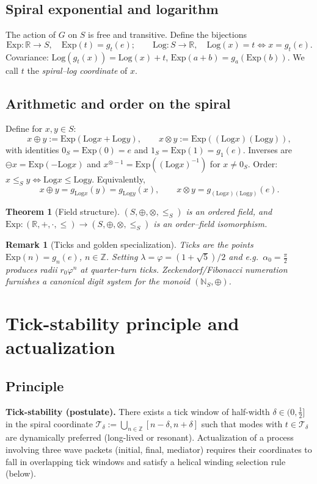 \documentclass[11pt]{article}
\newtheorem{theorem}{Theorem}
\newtheorem{remark}{Remark}
\newcommand{\Z}{\mathbb{Z}}
\newcommand{\R}{\mathbb{R}}
\newcommand{\N}{\mathbb{N}}
\newcommand{\Exp}{\mathrm{Exp}}
\newcommand{\Log}{\mathrm{Log}}
\begin{document}
\subsection{Spiral exponential and logarithm}
The action of \(G\) on \(S\) is free and transitive. Define the bijections
\begin{equation}
\Exp:\R\to S,\quad \Exp(t)=g_t(e);\qquad \Log:S\to\R,\quad \Log(x)=t\iff x=g_t(e).
\end{equation}
Covariance: \(\Log(g_t(x))=\Log(x)+t\), \(\Exp(a+b)=g_a(\Exp(b))\).
We call \(t\) the \emph{spiral--log coordinate} of \(x\).

\subsection{Arithmetic and order on the spiral}
Define for \(x,y\in S\):
\begin{equation}
x\oplus y:=\Exp(\Log x+\Log y),\qquad x\otimes y:=\Exp((\Log x)(\Log y)),
\end{equation}
with identities \(0_S=\Exp(0)=e\) and \(1_S=\Exp(1)=g_1(e)\). Inverses are \(\ominus x=\Exp(-\Log x)\) and \(x^{\otimes-1}=\Exp((\Log x)^{-1})\) for \(x\neq 0_S\).
Order: \(x\le_S y\iff \Log x\le \Log y\).
Equivalently,
\begin{equation}
x\oplus y=g_{\Log x}(y)=g_{\Log y}(x),\qquad
x\otimes y= g_{(\Log x)(\Log y)}(e).
\end{equation}

\begin{theorem}[Field structure]\label{thm:field}
\((S,\oplus,\otimes,\le_S)\) is an ordered field, and \(\Exp:(\R,+,\cdot,\le)\to (S,\oplus,\otimes,\le_S)\) is an order--field isomorphism.
\end{theorem}

\begin{remark}[Ticks and golden specialization]
\emph{Ticks} are the points \(\Exp(n)=g_n(e)\), \(n\in\Z\).
Setting \(\lambda=\varphi=(1+\sqrt{5})/2\) and e.g.\ \(\alpha_0=\tfrac{\pi}{2}\) produces radii \(r_0\varphi^n\) at quarter-turn ticks.
Zeckendorf/Fibonacci numeration furnishes a canonical digit system for the monoid \((\N_S,\oplus)\).
\end{remark}

\section{Tick-stability principle and actualization}
\subsection{Principle}
\textbf{Tick-stability (postulate).} There exists a tick window of half-width \(\delta\in(0,\tfrac12]\) in the spiral coordinate
\(\mathcal T_\delta:=\bigcup_{n\in\Z}[n-\delta,n+\delta]\)
such that modes with \(t\in\mathcal T_\delta\) are dynamically preferred (long-lived or resonant). Actualization of a process involving three wave packets (initial, final, mediator) requires their coordinates to fall in overlapping tick windows and satisfy a helical winding selection rule (below).
\end{document}
